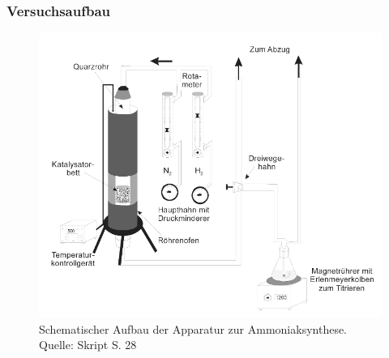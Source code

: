 \documentclass{scrartcl}
\begin{document}
\subsubsection{Versuchsaufbau}
\begin{figure}[h]
  \centering
     \includegraphics[width=1.0\textwidth]{Versuchsaufbau.png}
  \caption{Schematischer Aufbau der Apparatur zur Ammoniaksynthese. Quelle: Skript S. 28}
  \label{fig:Bild1}
\end{figure}
\end{document}
